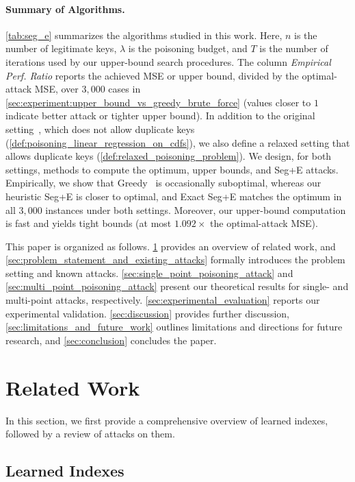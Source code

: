 \documentclass[acmsmall]{acmart}
\begin{document}
\paragraph{Summary of Algorithms.}
\cref{tab:seg_e} summarizes the algorithms studied in this work.
Here, $n$ is the number of legitimate keys, $\lambda$ is the poisoning budget, and $T$ is the number of iterations used by our upper-bound search procedures.
The column  \textit{Empirical Perf. Ratio} reports the achieved MSE or upper bound, divided by the optimal-attack MSE, over $3{,}000$ cases in \cref{sec:experiment:upper_bound_vs_greedy_brute_force} (values closer to $1$ indicate better attack or tighter upper bound).
In addition to the original setting~\cite{kornaropoulos2022price}, which does not allow duplicate keys (\cref{def:poisoning_linear_regression_on_cdfs}), we also define a relaxed setting that allows duplicate keys (\cref{def:relaxed_poisoning_problem}).
We design, for both settings, methods to compute the optimum, upper bounds, and Seg+E attacks.
Empirically, we show that Greedy~\citep{kornaropoulos2022price} is occasionally suboptimal, whereas our heuristic Seg+E is closer to optimal, and Exact Seg+E matches the optimum in all $3{,}000$ instances under both settings.
Moreover, our upper-bound computation is fast and yields tight bounds (at most $1.092\times$ the optimal-attack MSE).

This paper is organized as follows.
\cref{sec:related_work} provides an overview of related work, and 
\cref{sec:problem_statement_and_existing_attacks} formally introduces the problem setting and known attacks.
\cref{sec:single_point_poisoning_attack} and \cref{sec:multi_point_poisoning_attack} present our theoretical results for single- and multi-point attacks, respectively.
\cref{sec:experimental_evaluation} reports our experimental validation.
\cref{sec:discussion} provides further discussion, \cref{sec:limitations_and_future_work} outlines limitations and directions for future research, and \cref{sec:conclusion} concludes the paper.

\section{Related Work}
\label{sec:related_work}

In this section, we first provide a comprehensive overview of learned indexes, followed by a review of attacks on them.

\subsection{Learned Indexes}
\label{sec:related_work_learned_index}
\end{document}
